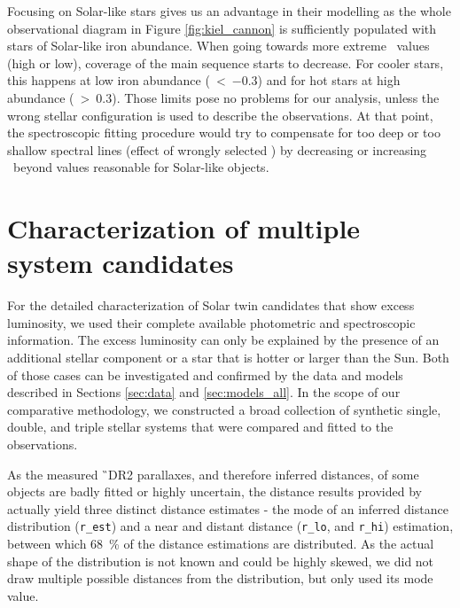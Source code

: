Focusing on Solar-like stars gives us an advantage in their modelling as the whole observational diagram in Figure \ref{fig:kiel_cannon} is sufficiently populated with stars of Solar-like iron abundance. When going towards more extreme \Feh\ values (high or low), coverage of the main sequence starts to decrease. For cooler stars, this happens at low iron abundance (\Feh~\textless~$-0.3$) and for hot stars at high abundance (\Feh~\textgreater~$0.3$). Those limits pose no problems for our analysis, unless the wrong stellar configuration is used to describe the observations. At that point, the spectroscopic fitting procedure would try to compensate for too deep or too shallow spectral lines (effect of wrongly selected \Teff) by decreasing or increasing \Feh\ beyond values reasonable for Solar-like objects. 


\section{Characterization of multiple system candidates}
\label{sec:multi_fit}
For the detailed characterization of Solar twin candidates that show excess luminosity, we used their complete available photometric and spectroscopic information. The excess luminosity can only be explained by the presence of an additional stellar component or a star that is hotter or larger than the Sun. Both of those cases can be investigated and confirmed by the data and models described in Sections \ref{sec:data} and \ref{sec:models_all}. In the scope of our comparative methodology, we constructed a broad collection of synthetic single, double, and triple stellar systems that were compared and fitted to the observations.

As the measured \G\ DR2 parallaxes, and therefore inferred distances, of some objects are badly fitted or highly uncertain, the distance results provided by \citep{2018AJ....156...58B} actually yield three distinct distance estimates - the mode of an inferred distance distribution (\texttt{r\_est}) and a near and distant distance (\texttt{r\_lo}, and \texttt{r\_hi}) estimation, between which 68~\% of the distance estimations are distributed. As the actual shape of the distribution is not known and could be highly skewed, we did not draw multiple possible distances from the distribution, but only used its mode value.

